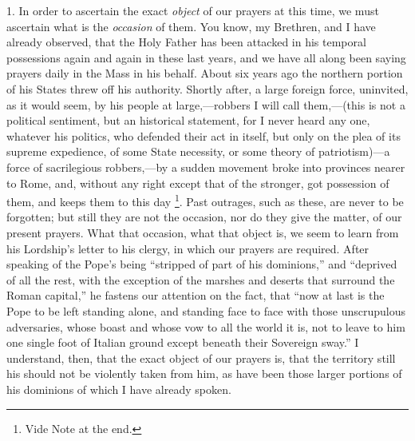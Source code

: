 1. In order to ascertain the exact \emph{object} of
our prayers at this time, we must ascertain what is the \emph{occasion}
of them. You know, my Brethren, and I have already
observed, that the Holy Father has been attacked in his
temporal possessions again and again in these last years,
and we have all along been saying prayers daily in the
Mass in his behalf. About six years ago the northern
portion of his States threw off his authority. Shortly
after, a large foreign force, uninvited, as it would
seem, by his people at large,—robbers I will call
them,—(this is not a political sentiment, but an
historical statement, for I never heard any one, whatever
his politics, who defended their act in itself, but only
on the plea of its supreme expedience, of some State
necessity, or some theory of patriotism)—a force of
sacrilegious robbers,—by a sudden movement broke
into provinces nearer to Rome, and, without any right
except that of the stronger, got possession of them, and
keeps them to this day \footnote{Vide Note at the end.}. Past outrages, such as these,
are never to be forgotten; but still they are not the
occasion, nor do they give the matter, of our present
prayers. What that occasion, what that object is, we seem
to learn from his Lordship's letter to his clergy, in
which our prayers are required. After speaking of the
Pope's being ``stripped of part of his
dominions,'' and ``deprived of all the rest, with
the exception of the marshes and deserts that surround
the Roman capital,'' he fastens our attention on the
fact, that ``now at last is the Pope to be left
standing alone, and standing face to face with those
unscrupulous adversaries, whose boast and whose vow to
all the world it is, not to leave to him one single foot
of Italian ground except beneath their Sovereign
sway.'' I understand, then, that the exact object of
our prayers is, that the territory still his should not
be violently taken from him, as have been those larger
portions of his dominions of which I have already spoken.

